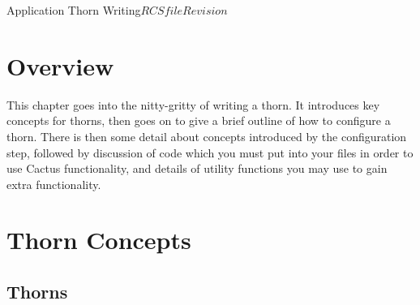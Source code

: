 
\begin{cactuspart}{Application Thorn Writing}{$RCSfile$}{$Revision$}
\label{part:ThornWriters}
\renewcommand{\thepage}{\Alph{part}\arabic{page}}


\chapter{Overview}

This chapter goes into the nitty-gritty of writing a thorn.
It introduces key concepts for thorns, then goes on to give
a brief outline of how to configure a thorn.
There is then some detail about concepts introduced by the configuration
step, followed by discussion of code which you must put into your files
in order to use Cactus functionality, and details of utility functions
you may use to gain extra functionality.


\chapter{Thorn Concepts}
\label{chap:thorn_concepts}


\section{Thorns}


\end{cactuspart}
